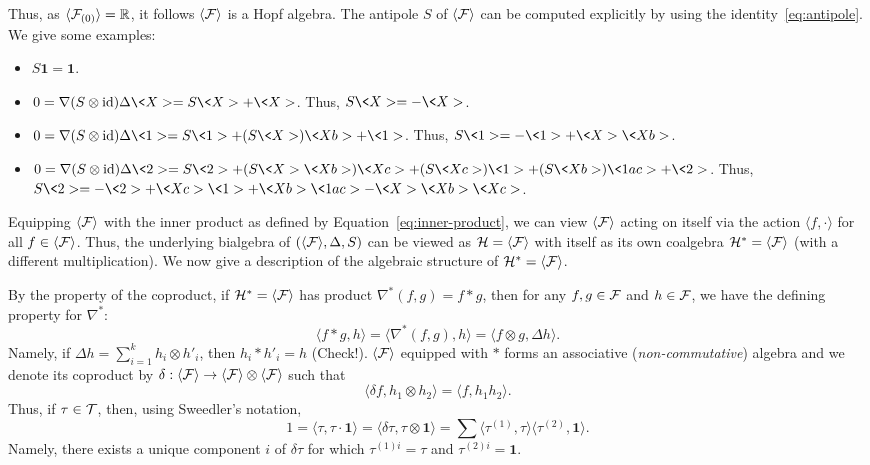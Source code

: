\documentclass[11pt]{style/preprint}
\begin{document}
Thus, as \(\langle {\mathcal F}_{(0)}\rangle = \mathbb{R}\), it follows \(\langle {\mathcal F}\rangle\) is a Hopf algebra.
The antipole \(S\) of \(\langle {\mathcal F}\rangle\) can be computed explicitly by using the identity~\eqref{eq:antipole}. 
We give some examples:
\begin{itemize}
  \item \(S \mathbf{1} = \mathbf{1}\).
  \item \(0 = \nabla (S \otimes \text{id}) \Delta \<X> = S \<X> + \<X>\). Thus, \(S \<X> = -\<X>\).
  \item \(0 = \nabla (S \otimes \text{id}) \Delta \<1> = S \<1> + (S \<X>) \<Xb> + \<1>\). 
    Thus, \(S \<1> = -\<1> + \<X> \<Xb>\).
  \item \(0 = \nabla (S \otimes \text{id}) \Delta \<2> = S \<2> + (S \<X> \<Xb>) \<Xc> + (S \<Xc>) \<1> + (S \<Xb>) \<1ac> + \<2>\).
    Thus, \(S \<2> = -\<2> + \<Xc> \<1> + \<Xb> \<1ac> - \<X> \<Xb> \<Xc>\).
\end{itemize}

Equipping \(\langle {\mathcal F} \rangle\) with the inner product as defined by Equation~\eqref{eq:inner-product}, 
we can view \(\langle {\mathcal F} \rangle\) acting on itself via the action \(\langle f, \cdot \rangle\) 
for all \(f \in \langle {\mathcal F} \rangle\). Thus, the underlying bialgebra of \((\langle {\mathcal F} \rangle, \Delta, S)\) 
can be viewed as \({\mathcal H} = \langle {\mathcal F} \rangle\) with itself as its own coalgebra \({\mathcal H}^* = \langle {\mathcal F} \rangle\) 
(with a different multiplication). We now give a description of the algebraic structure of 
\({\mathcal H}^* = \langle {\mathcal F} \rangle\).

By the property of the coproduct, if \({\mathcal H}^* = \langle {\mathcal F} \rangle\) has product \(\nabla^*(f, g) = f * g\), then
for any \(f, g \in {\mathcal F}\) and \(h \in {\mathcal F}\), we have the defining property for \(\nabla^*\):
\[\langle f * g, h\rangle = \langle \nabla^*(f, g), h\rangle = \langle f \otimes g, \Delta h\rangle.\]
Namely, if \(\Delta h = \sum_{i = 1}^k h_i \otimes h'_i\), then \(h_i * h'_i = h\) (Check!). 
\(\langle {\mathcal F} \rangle\) equipped with \(*\) forms an associative (\textit{non-commutative}) algebra 
and we denote its coproduct by \(\delta :  \langle {\mathcal F} \rangle \to  \langle {\mathcal F} \rangle \otimes  \langle {\mathcal F} \rangle\) 
such that 
\[\langle \delta f, h_1 \otimes h_2\rangle = \langle f, h_1 h_2\rangle.\]
Thus, if \(\tau \in {\mathcal T}\), then, using Sweedler's notation,
\[1 = \langle \tau, \tau \cdot \mathbf{1}\rangle = \langle \delta \tau, \tau \otimes \mathbf{1}\rangle
  = \sum \langle \tau^{(1)}, \tau\rangle \langle \tau^{(2)}, \mathbf{1}\rangle.\]
Namely, there exists a unique component \(i\) of \(\delta \tau\) for which \(\tau^{(1)i} = \tau\) and 
\(\tau^{(2)i} = \mathbf{1}\).
\end{document}
